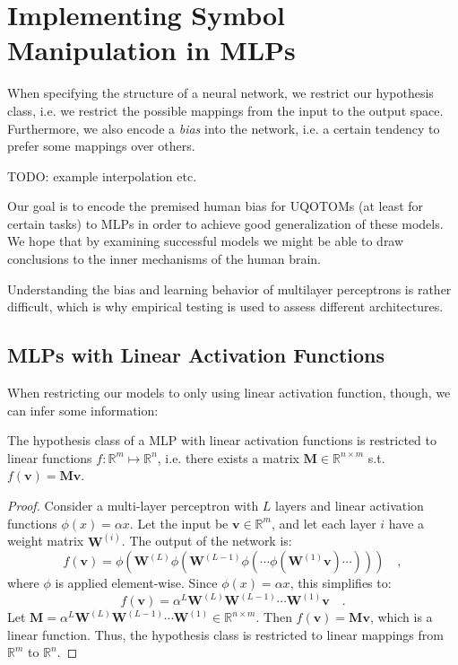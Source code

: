 \documentclass[../../main.tex]{subfiles}
\begin{document}
    \section{Implementing Symbol Manipulation in MLPs}
    When specifying the structure of a neural network, we restrict our hypothesis class, i.e. we restrict the possible mappings from the input to the output space. Furthermore, we also encode a \emph{bias} into the network, i.e. a certain tendency to prefer some mappings over others.

    TODO: example interpolation etc.

    Our goal is to encode the premised human bias for UQOTOMs (at least for certain tasks) to MLPs in order to achieve good generalization of these models. We hope that by examining successful models we might be able to draw conclusions to the inner mechanisms of the human brain.
    
    Understanding the bias and learning behavior of multilayer perceptrons is rather difficult, which is why empirical testing is used to assess different architectures.
    
    \subsection{MLPs with Linear Activation Functions}
    When restricting our models to only using linear activation function, though, we can infer some information:
    
    \begin{proposition}
        \label{proposition:linear_mlp}
        The hypothesis class of a MLP with linear activation functions is restricted to linear functions $f: \mathbb{R}^m \mapsto \mathbb{R}^n$, i.e. there exists a matrix $\bm{M} \in \mathbb{R}^{n \times m}$ s.t. $f(\bm{v}) = \bm{Mv}$.
    \end{proposition}
    \begin{proof}
        Consider a multi-layer perceptron with $L$ layers and linear activation functions $\phi(x) = \alpha x$. Let the input be $\bm{v} \in \mathbb{R}^m$, and let each layer $i$ have a weight matrix $\bm{W}^{(i)}$. The output of the network is:
        \[
        f(\bm{v}) = \phi\left( \bm{W}^{(L)} \phi\left( \bm{W}^{(L-1)} \phi\left( \cdots \phi\left( \bm{W}^{(1)} \bm{v} \right) \cdots \right) \right) \right) \quad ,
        \]
        where $\phi$ is applied element-wise. Since $\phi(x) = \alpha x$, this simplifies to:
        \[
        f(\bm{v}) = \alpha^L \bm{W}^{(L)} \bm{W}^{(L-1)} \cdots \bm{W}^{(1)} \bm{v} \quad .
        \]
        Let $\bm{M} = \alpha^L \bm{W}^{(L)} \bm{W}^{(L-1)} \cdots \bm{W}^{(1)} \in \mathbb{R}^{n \times m}$. Then $f(\bm{v}) = \bm{M} \bm{v}$, which is a linear function. Thus, the hypothesis class is restricted to linear mappings from $\mathbb{R}^m$ to $\mathbb{R}^n$.
    \end{proof}
\end{document}
